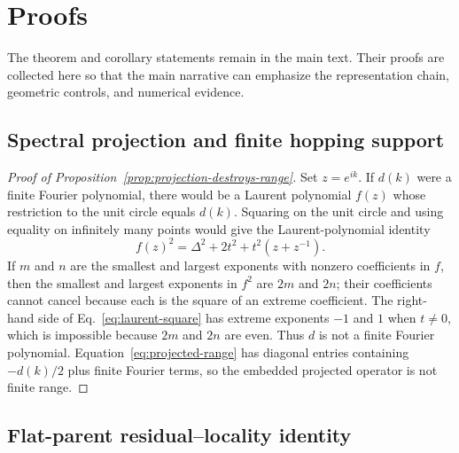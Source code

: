 \section{Proofs}
\label{app:proofs}

The theorem and corollary statements remain in the main text. Their proofs are collected
here so that the main narrative can emphasize the representation chain, geometric
controls, and numerical evidence.

\subsection{Spectral projection and finite hopping support}
\label{app:proof-projection-range}

\begin{proof}[Proof of Proposition~\ref{prop:projection-destroys-range}]
Set $z=e^{ik}$. If $d(k)$ were a finite Fourier polynomial, there would be a Laurent
polynomial $f(z)$ whose restriction to the unit circle equals $d(k)$. Squaring on the
unit circle and using equality on infinitely many points would give the Laurent-polynomial
identity
\begin{equation}
 f(z)^2=\Delta^2+2t^2+t^2(z+z^{-1}).
 \label{eq:laurent-square}
\end{equation}
If $m$ and $n$ are the smallest and largest exponents with nonzero coefficients in
$f$, then the smallest and largest exponents in $f^2$ are $2m$ and $2n$; their
coefficients cannot cancel because each is the square of an extreme coefficient. The
right-hand side of Eq.~\eqref{eq:laurent-square} has extreme exponents $-1$ and $1$
when $t\ne0$, which is impossible because $2m$ and $2n$ are even. Thus $d$ is not a
finite Fourier polynomial. Equation~\eqref{eq:projected-range} has diagonal entries
containing $-d(k)/2$ plus finite Fourier terms, so the embedded projected operator is not
finite range.
\end{proof}

\subsection{Flat-parent residual--locality identity}
\label{app:proof-flat-parent}

